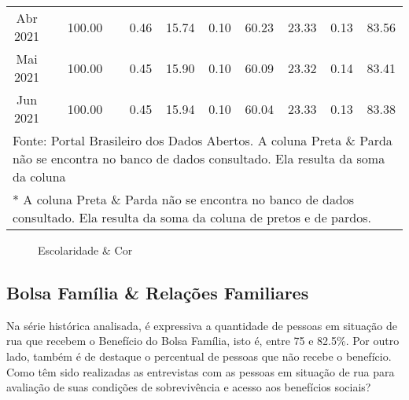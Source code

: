 \documentclass[12pt]{article}
\begin{document}
\begin{landscape}
\begin{table}[htbp]
\begin{adjustbox}{max width=\linewidth}
\begin{tabular}{lllllllllll}
    \multicolumn{1}{c}{Abr 2021} &      & \multicolumn{1}{c}{100.00} &      & \multicolumn{1}{c}{0.46} & \multicolumn{1}{c}{15.74} & \multicolumn{1}{c}{0.10} & \multicolumn{1}{c}{60.23} & \multicolumn{1}{c}{23.33} & \multicolumn{1}{c}{0.13} & \multicolumn{1}{c}{83.56} \\
    \multicolumn{1}{c}{Mai 2021} &      & \multicolumn{1}{c}{100.00} &      & \multicolumn{1}{c}{0.45} & \multicolumn{1}{c}{15.90} & \multicolumn{1}{c}{0.10} & \multicolumn{1}{c}{60.09} & \multicolumn{1}{c}{23.32} & \multicolumn{1}{c}{0.14} & \multicolumn{1}{c}{83.41} \\
    \multicolumn{1}{c}{Jun 2021} &      & \multicolumn{1}{c}{100.00} &      & \multicolumn{1}{c}{0.45} & \multicolumn{1}{c}{15.94} & \multicolumn{1}{c}{0.10} & \multicolumn{1}{c}{60.04} & \multicolumn{1}{c}{23.33} & \multicolumn{1}{c}{0.13} & \multicolumn{1}{c}{83.38} \\
    \midrule
    \multicolumn{11}{l}{Fonte: Portal Brasileiro dos Dados Abertos. A coluna Preta \& Parda não se encontra no banco de dados consultado. Ela resulta da soma da coluna} \\
    \multicolumn{11}{l}{* A coluna Preta \& Parda não se encontra no banco de dados consultado. Ela resulta da soma da coluna de pretos e de pardos.} \\
    \end{tabular}%
    \end{adjustbox}
  \label{tab:cor}%
\end{table}%
\end{landscape}

\begin{landscape}
\pagestyle{empty}
\begin{figure}[H]
	\caption{Escolaridade \& Cor}
	\qquad
\end{figure}
\end{landscape}

\subsection{Bolsa Família \& Relações Familiares}

Na série histórica analisada, é expressiva a quantidade de pessoas em situação de rua que recebem o Benefício do Bolsa Família, isto é, entre 75 e 82.5\%. Por outro lado, também é de destaque o percentual de pessoas que não recebe o benefício. Como têm sido realizadas as entrevistas com as pessoas em situação de rua para avaliação de suas condições de sobrevivência e acesso aos benefícios sociais?\\ 
\end{document}
